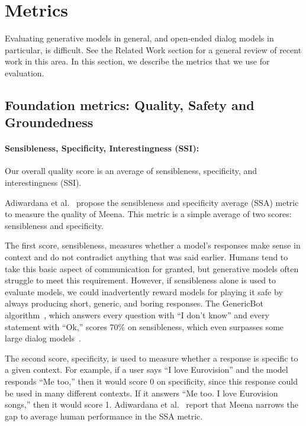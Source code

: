 \documentclass{article}
\def\Factualitymetric{Groundedness\xspace}
\begin{document}
\section{Metrics}
\label{sec:metric}

Evaluating generative models in general, and open-ended dialog models in particular, is difficult. See the Related Work section for a general review of recent work in this area. In this section, we describe the metrics that we use for evaluation.

\subsection{Foundation metrics: Quality, Safety and \Factualitymetric}
\label{sec:multitask}

\paragraph{Sensibleness, Specificity, Interestingness (SSI): }Our overall quality score is an average of sensibleness, specificity, and interestingness (SSI).

Adiwardana et al.~\cite{adiwardana2020humanlike} propose the sensibleness and specificity average (SSA) metric to measure the quality of Meena. This metric is a simple average of two scores: sensibleness and specificity.

The first score, sensibleness, measures whether a model’s responses make sense in context and do not contradict anything that was said earlier. Humans tend to take this basic aspect of communication for granted, but generative models often struggle to meet this requirement. However, if sensibleness alone is used to evaluate models, we could inadvertently reward models for playing it safe by always producing short, generic, and boring responses. The GenericBot algorithm~\cite{adiwardana2020humanlike}, which answers every question with ``I don't know'' and every statement with ``Ok,'' scores 70\% on sensibleness, which even surpasses some large dialog models~\cite{adiwardana2020humanlike}.

The second score, specificity, is used to measure whether a response is specific to a given context. For example, if a user says “I love Eurovision” and the model responds “Me too,” then it would score 0 on specificity, since this response could be used in many different contexts. If it answers “Me too. I love Eurovision songs,” then it would score 1. Adiwardana et al.~\cite{adiwardana2020humanlike} report that Meena narrows the gap to average human performance in the SSA metric.
\end{document}
